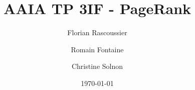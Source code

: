 
\newcommand{\thetitle}{AAIA TP 3IF - PageRank}
\newcommand{\theauthor}{Florian Rascoussier \and Romain Fontaine \and Christine Solnon}

\title{\thetitle}
\author{\theauthor}
\date{\today}